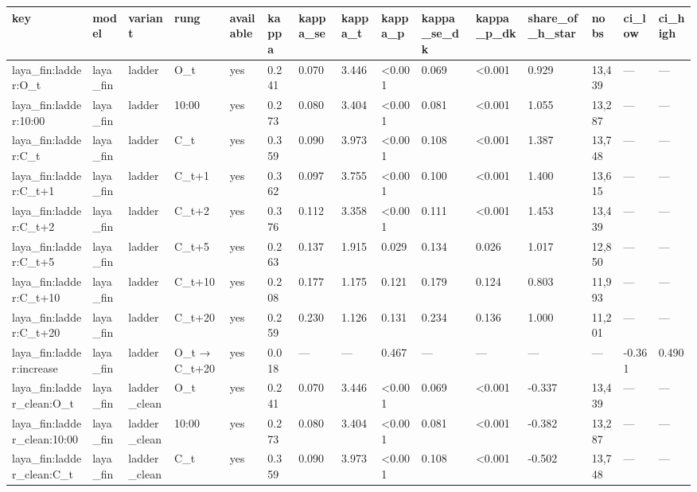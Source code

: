 \begin{tabular}{lllllllllllllll}
\toprule
key & model & variant & rung & available & kappa & kappa\_se & kappa\_t & kappa\_p & kappa\_se\_dk & kappa\_p\_dk & share\_of\_h\_star & nobs & ci\_low & ci\_high \\
\midrule
laya\_fin:ladder:O\_t & laya\_fin & ladder & O\_t & yes & 0.241 & 0.070 & 3.446 & <0.001 & 0.069 & <0.001 & 0.929 & 13,439 & — & — \\
laya\_fin:ladder:10:00 & laya\_fin & ladder & 10:00 & yes & 0.273 & 0.080 & 3.404 & <0.001 & 0.081 & <0.001 & 1.055 & 13,287 & — & — \\
laya\_fin:ladder:C\_t & laya\_fin & ladder & C\_t & yes & 0.359 & 0.090 & 3.973 & <0.001 & 0.108 & <0.001 & 1.387 & 13,748 & — & — \\
laya\_fin:ladder:C\_t+1 & laya\_fin & ladder & C\_t+1 & yes & 0.362 & 0.097 & 3.755 & <0.001 & 0.100 & <0.001 & 1.400 & 13,615 & — & — \\
laya\_fin:ladder:C\_t+2 & laya\_fin & ladder & C\_t+2 & yes & 0.376 & 0.112 & 3.358 & <0.001 & 0.111 & <0.001 & 1.453 & 13,439 & — & — \\
laya\_fin:ladder:C\_t+5 & laya\_fin & ladder & C\_t+5 & yes & 0.263 & 0.137 & 1.915 & 0.029 & 0.134 & 0.026 & 1.017 & 12,850 & — & — \\
laya\_fin:ladder:C\_t+10 & laya\_fin & ladder & C\_t+10 & yes & 0.208 & 0.177 & 1.175 & 0.121 & 0.179 & 0.124 & 0.803 & 11,993 & — & — \\
laya\_fin:ladder:C\_t+20 & laya\_fin & ladder & C\_t+20 & yes & 0.259 & 0.230 & 1.126 & 0.131 & 0.234 & 0.136 & 1.000 & 11,201 & — & — \\
laya\_fin:ladder:increase & laya\_fin & ladder & O\_t → C\_t+20 & yes & 0.018 & — & — & 0.467 & — & — & — & — & -0.361 & 0.490 \\
laya\_fin:ladder\_clean:O\_t & laya\_fin & ladder\_clean & O\_t & yes & 0.241 & 0.070 & 3.446 & <0.001 & 0.069 & <0.001 & -0.337 & 13,439 & — & — \\
laya\_fin:ladder\_clean:10:00 & laya\_fin & ladder\_clean & 10:00 & yes & 0.273 & 0.080 & 3.404 & <0.001 & 0.081 & <0.001 & -0.382 & 13,287 & — & — \\
laya\_fin:ladder\_clean:C\_t & laya\_fin & ladder\_clean & C\_t & yes & 0.359 & 0.090 & 3.973 & <0.001 & 0.108 & <0.001 & -0.502 & 13,748 & — & — \\

\end{tabular}
